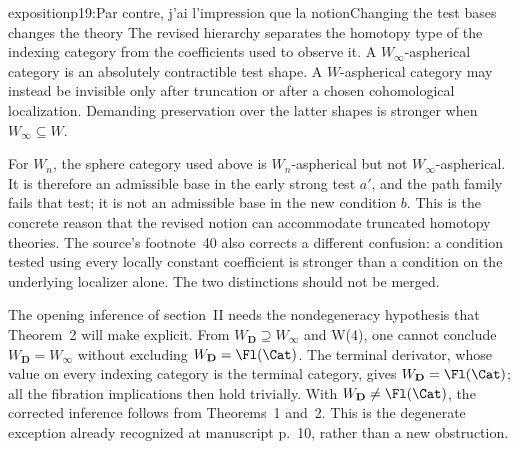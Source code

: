 \begin{dcomment}{exposition}{p19:Par contre, j'ai l'impression que la notion}{Changing the test bases changes the theory}
The revised hierarchy separates the homotopy type of the indexing category from the coefficients used to observe it. A \(W_\infty\)-aspherical category is an absolutely contractible test shape. A \(W\)-aspherical category may instead be invisible only after truncation or after a chosen cohomological localization. Demanding preservation over the latter shapes is stronger when \(W_\infty\subseteq W\).

For \(W_n\), the sphere category used above is \(W_n\)-aspherical but not \(W_\infty\)-aspherical. It is therefore an admissible base in the early strong test \(a'\), and the path family fails that test; it is not an admissible base in the new condition \(b\). This is the concrete reason that the revised notion can accommodate truncated homotopy theories. The source's footnote~40 also corrects a different confusion: a condition tested using every locally constant coefficient is stronger than a condition on the underlying localizer alone. The two distinctions should not be merged.

The opening inference of section~II needs the nondegeneracy hypothesis that Theorem~2 will make explicit. From \(W_{\mathbf D}\supseteq W_\infty\) and W(4), one cannot conclude \(W_{\mathbf D}=W_\infty\) without excluding \(W_{\mathbf D}=\Fl(\Cat)\). The terminal derivator, whose value on every indexing category is the terminal category, gives \(W_{\mathbf D}=\Fl(\Cat)\); all the fibration implications then hold trivially. With \(W_{\mathbf D}\ne\Fl(\Cat)\), the corrected inference follows from Theorems~1 and~2. This is the degenerate exception already recognized at manuscript p.~10, rather than a new obstruction.
\end{dcomment}

